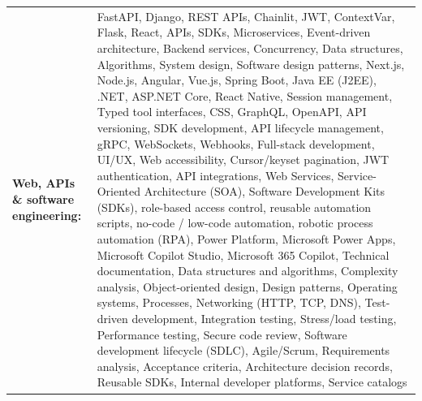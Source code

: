 \documentclass[letterpaper,11pt]{article}
\begin{document}
\begin{tabularx}{\linewidth}{@{}>{\raggedright\arraybackslash}p{1.8in}X@{}}
\textbf{Web, APIs \& software engineering:} & \footnotesize{FastAPI, Django, REST APIs, Chainlit, JWT, ContextVar, Flask, React, APIs, SDKs, Microservices, Event-driven architecture, Backend services, Concurrency, Data structures, Algorithms, System design, Software design patterns, Next.js, Node.js, Angular, Vue.js, Spring Boot, Java EE (J2EE), .NET, ASP.NET Core, React Native, Session management, Typed tool interfaces, CSS, GraphQL, OpenAPI, API versioning, SDK development, API lifecycle management, gRPC, WebSockets, Webhooks, Full-stack development, UI/UX, Web accessibility, Cursor/keyset pagination, JWT authentication, API integrations, Web Services, Service-Oriented Architecture (SOA), Software Development Kits (SDKs), role-based access control, reusable automation scripts, no-code / low-code automation, robotic process automation (RPA), Power Platform, Microsoft Power Apps, Microsoft Copilot Studio, Microsoft 365 Copilot, Technical documentation, Data structures and algorithms, Complexity analysis, Object-oriented design, Design patterns, Operating systems, Processes, Networking (HTTP, TCP, DNS), Test-driven development, Integration testing, Stress/load testing, Performance testing, Secure code review, Software development lifecycle (SDLC), Agile/Scrum, Requirements analysis, Acceptance criteria, Architecture decision records, Reusable SDKs, Internal developer platforms, Service catalogs}\\
\end{tabularx}
\par\vspace{2pt}
\end{document}
